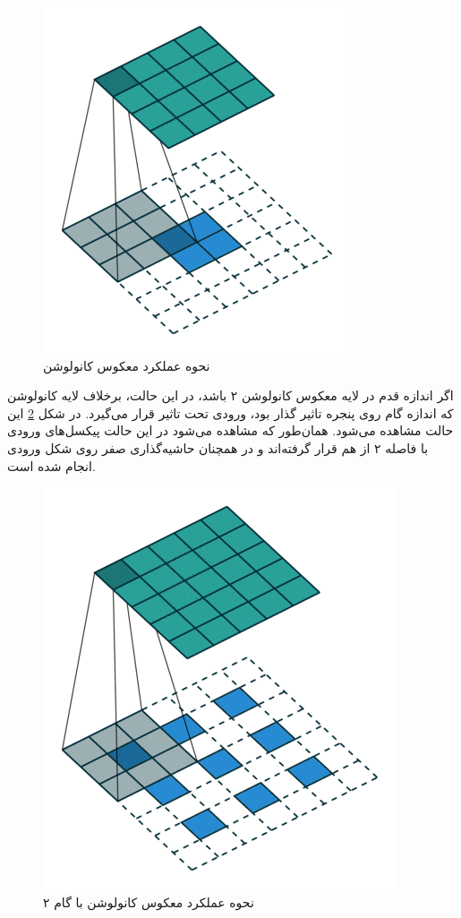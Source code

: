 \documentclass[12pt, a4paper]{book}
\begin{document}
\begin{figure}[h]
    \centering
    \includegraphics[scale=0.5]{images/deconvolution_step1.png}
    \caption{نحوه عملکرد معکوس کانولوشن}
    \label{deconvolution}
\end{figure}

اگر اندازه قدم در لایه معکوس کانولوشن ۲ باشد، در این حالت، برخلاف لایه کانولوشن که اندازه گام روی پنجره تاثیر گذار بود،
ورودی تحت تاثیر قرار می‌گیرد. در شکل \ref{deconvolution_step2} این حالت مشاهده می‌شود. همان‌طور که مشاهده می‌شود در این
حالت پیکسل‌های ورودی با فاصله ۲ از هم قرار گرفته‌اند و در همچنان حاشیه‌گذاری صفر روی شکل ورودی انجام شده است.

\begin{figure}
    \centering
    \includegraphics[scale=0.5]{images/deconvolution_step2.png}
    \caption{نحوه عملکرد معکوس کانولوشن با گام ۲}
    \label{deconvolution_step2}
\end{figure}
\end{document}
